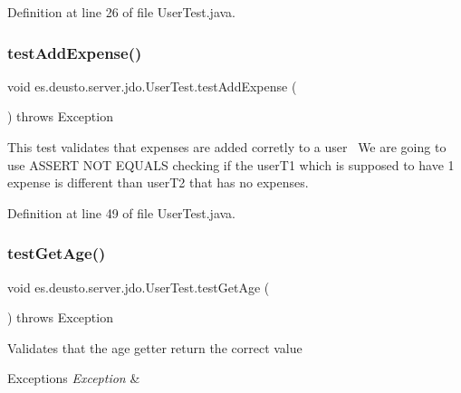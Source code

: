 Definition at line 26 of file User\+Test.\+java.

\mbox{\label{classes_1_1deusto_1_1server_1_1jdo_1_1_user_test_a60b10702d0f2d5b45895ce6bccd1d89e}} 
\subsubsection{\texorpdfstring{test\+Add\+Expense()}{testAddExpense()}}
{\footnotesize\ttfamily void es.\+deusto.\+server.\+jdo.\+User\+Test.\+test\+Add\+Expense (\begin{DoxyParamCaption}{ }\end{DoxyParamCaption}) throws Exception}

This test validates that expenses are added corretly to a user~\newline
We are going to use A\+S\+S\+E\+RT N\+OT E\+Q\+U\+A\+LS checking if the user\+T1 which is supposed to have 1 expense is different than user\+T2 that has no expenses. 

Definition at line 49 of file User\+Test.\+java.

\mbox{\label{classes_1_1deusto_1_1server_1_1jdo_1_1_user_test_a13dfa5e5c4795b59612fbea70ba5f3af}} 
\subsubsection{\texorpdfstring{test\+Get\+Age()}{testGetAge()}}
{\footnotesize\ttfamily void es.\+deusto.\+server.\+jdo.\+User\+Test.\+test\+Get\+Age (\begin{DoxyParamCaption}{ }\end{DoxyParamCaption}) throws Exception}

Validates that the age getter return the correct value 
\begin{DoxyExceptions}{Exceptions}
{\em Exception} & \\
\hline
\end{DoxyExceptions}


